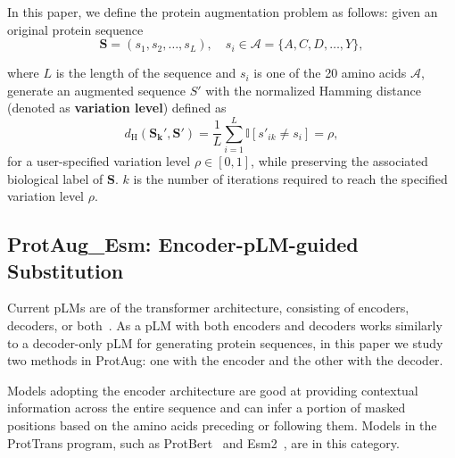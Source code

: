 \documentclass{article}
\begin{document}
In this paper, we define the protein augmentation problem as follows: given an original protein sequence 
\begin{equation}
\mathbf{S} = (s_1, s_2, \dots, s_L), \quad s_i \in \mathcal{A} = \{A, C, D, \dots, Y\},
\end{equation}

\noindent where $L$ is the length of the sequence and $s_i$ is one of the 20 amino acids $\mathcal{A}$, generate an augmented sequence $S'$ with the normalized Hamming distance (denoted as \textbf{variation level}) defined as
\begin{equation}
d_{\text{H}}(\mathbf{S_k}', \mathbf{S}') = \frac{1}{L}\sum_{i=1}^{L} \mathbb{I}\left[s'_{ik} \neq s_i\right] = \rho,
\end{equation}
\noindent for a user-specified variation level $\rho \in [0,1]$, while preserving the associated biological label of $\mathbf{S}$. $k$ is the number of iterations required to reach the specified variation level $\rho$.


\subsection{ProtAug\_Esm: Encoder-pLM-guided Substitution}
Current pLMs are of the transformer architecture, consisting of encoders, decoders, or both~\cite{elnaggar2021prottrans}. As a pLM with both encoders and decoders works similarly to a decoder-only pLM for generating protein sequences, in this paper we study two methods in ProtAug: one with the encoder and the other with the decoder.

Models adopting the encoder architecture are good at providing contextual information across the entire sequence and can infer a portion of masked positions based on the amino acids preceding or following them. Models in the ProtTrans program, such as ProtBert~\cite{elnaggar2021prottrans} and Esm2~\cite{lin2023esm2}, are in this category. 
\end{document}
